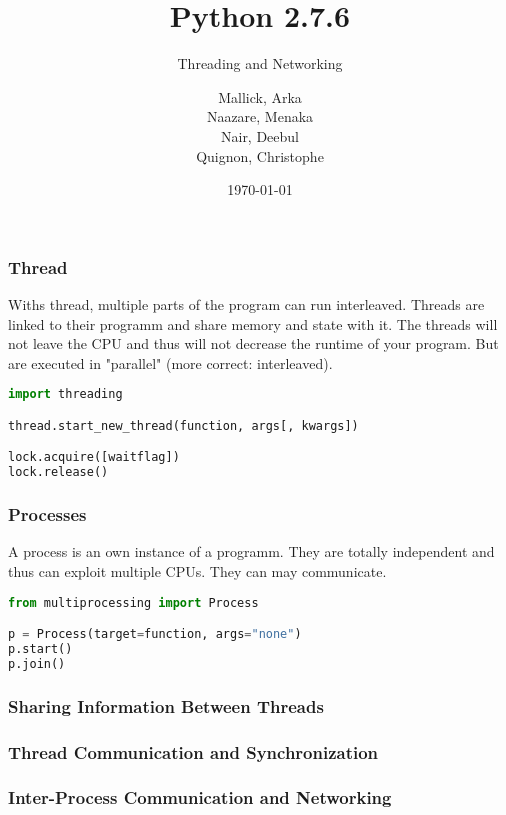 \documentclass{beamer}
\begin{document}
\title{Python 2.7.6}
\subtitle{Threading and Networking}
\author{
  Mallick, Arka\\
  Naazare, Menaka \\
  Nair, Deebul\\
  Quignon, Christophe \\
} 
\date{\today}

\begin{frame}
\titlepage
\end{frame}

\begin{frame}[fragile]
\frametitle{Thread}
Withs thread, multiple parts of the program can run interleaved. Threads are linked to their programm and share memory and state with it.
The threads will not leave the CPU and thus will not decrease the runtime of your program. But are executed in "parallel" (more correct: interleaved).


\begin{lstlisting}[language=Python]
import threading

thread.start_new_thread(function, args[, kwargs])

lock.acquire([waitflag])
lock.release()
\end{lstlisting}
\end{frame}

\begin{frame}[fragile]
\frametitle{Processes}
A process is an own instance of a programm. They are totally independent and thus can exploit multiple CPUs. They can may communicate. 

\begin{lstlisting}[language=Python]
from multiprocessing import Process

p = Process(target=function, args="none")
p.start()
p.join()
\end{lstlisting}
\end{frame}


\begin{frame}[fragile]
\frametitle{Sharing Information Between Threads}

\end{frame}


\begin{frame}[fragile]
\frametitle{Thread Communication and Synchronization}

\end{frame}


\begin{frame}[fragile]
\frametitle{Inter-Process Communication and Networking}

\end{frame}
\end{document}
